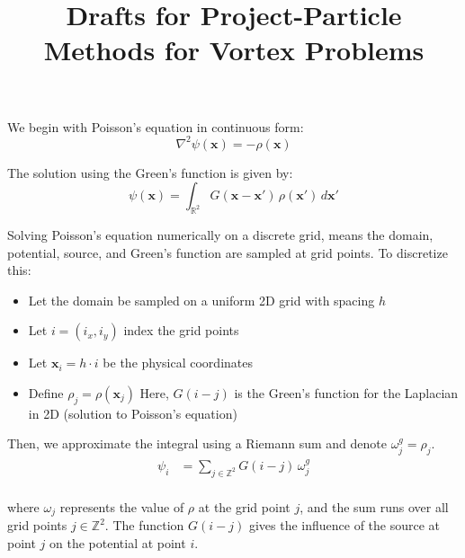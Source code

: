 \documentclass[11pt]{article}
\title{Drafts for Project-Particle Methods for Vortex Problems}
\begin{document}
\maketitle

\noindent

We begin with Poisson's equation in continuous form:
\[
    \nabla^2 \psi(\mathbf{x}) = -\rho(\mathbf{x})
\]

The solution using the Green's function is given by:
\[
    \psi(\mathbf{x}) = \int_{\mathbb{R}^2} G(\mathbf{x} - \mathbf{x}') \, \rho(\mathbf{x}') \, d\mathbf{x}'
\]

Solving Poisson's equation numerically on a discrete grid,
means the domain, potential, source, and Green's function are sampled at grid points.
To discretize this:
\vspace{-0.5em}
\begin{itemize}
    \setlength{}{\itemsep=-1pt}
    \item Let the domain be sampled on a uniform 2D grid with spacing \( h \)
    \item Let \( i = (i_x, i_y) \) index the grid points
    \item Let \( \mathbf{x}_i = h \cdot i \) be the physical coordinates
    \item Define \( \rho_j = \rho(\mathbf{x}_j) \) Here, \(G(i - j)\) is the Green's function for the Laplacian in 2D (solution to Poisson's equation) %
\end{itemize}

Then, we approximate the integral using a Riemann sum and denote \( \omega^g_j = \rho_j \).
\begin{equation*}
    \begin{aligned}
        \psi_i
         & = \sum_{j \in \mathbb{Z}^2} G(i - j) \, \omega^g_j \\
    \end{aligned}
\end{equation*}

where \( \omega_j \) represents the value of \( \rho \) at the grid point \( j \), and the sum runs over all grid points \( j \in \mathbb{Z}^2 \). The function \( G(i - j) \) gives the influence of the source at point \( j \) on the potential at point \( i \).
\end{document}
